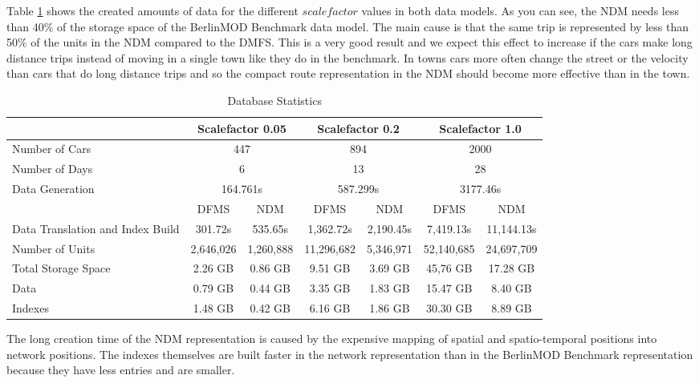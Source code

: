 \documentclass[a4paper]{article}
\newcommand{\bmodb} {BerlinMOD Benchmark}
\begin{document}
Table \ref{tab:dbstat} shows the created amounts of data for the different $scalefactor$
values in both data models. As you can see, the NDM needs less
than 40\% of the storage space of the \bmodb{} data model. The main cause is that
the same trip is represented by less than 50\% of the units in the NDM
compared to the DMFS. This is a very good result and we expect this effect to
increase if the cars make long distance
trips instead of moving in a single town like they do in the benchmark. In towns
cars more often change the street or the velocity than cars that do long distance
trips and so the compact route representation in the NDM should become
more effective than in the town.
\begin{table}[H]
\begin{center}
\begin{scriptsize}
\begin{tabularx}{1.0\textwidth}{|X|c|c|c|c|c|c|}
\hline
&\multicolumn{2}{c|}{\textbf{Scalefactor 0.05}}&\multicolumn{2}{c|}{\textbf{Scalefactor 0.2}}&\multicolumn{2}{c|}{\textbf{Scalefactor 1.0}}\\
\hline
Number of Cars&\multicolumn{2}{c|}{447}&\multicolumn{2}{c|}{894}&\multicolumn{2}{c|}{2000}\\
\hline
Number of Days&\multicolumn{2}{c|}{6}&\multicolumn{2}{c|}{13}&\multicolumn{2}{c|}{28}\\
\hline
Data Generation&\multicolumn{2}{c|}{164.761s}&\multicolumn{2}{c|}{587.299s}&\multicolumn{2}{c|}{3177.46s}\\
\hline
&DFMS&NDM&DFMS&NDM&DFMS&NDM\\
\hline
Data Translation
and Index Build&301.72s&535.65s&1,362.72s&2,190.45s&7,419.13s&11,144.13s\\
\hline
Number of Units&2,646,026&1,260,888&11,296,682&5,346,971&52,140,685&24,697,709\\
\hline
Total Storage Space&2.26 GB&0.86 GB&9.51 GB&3.69 GB&45,76 GB&17.28 GB\\
Data&0.79 GB&0.44 GB&3.35 GB&1.83 GB&15.47 GB& 8.40 GB\\
Indexes&1.48 GB&0.42 GB&6.16 GB&1.86 GB&30.30 GB&8.89 GB\\
\hline
\end{tabularx}
\end{scriptsize}
\caption{Database Statistics}
\label{tab:dbstat}
\end{center}
\end{table}
The long creation time of the NDM representation is
caused by the expensive mapping of spatial and spatio-temporal positions into
network positions. The indexes themselves are built faster in the network representation
than in the \bmodb{} representation because they have less entries and are smaller.
\end{document}
